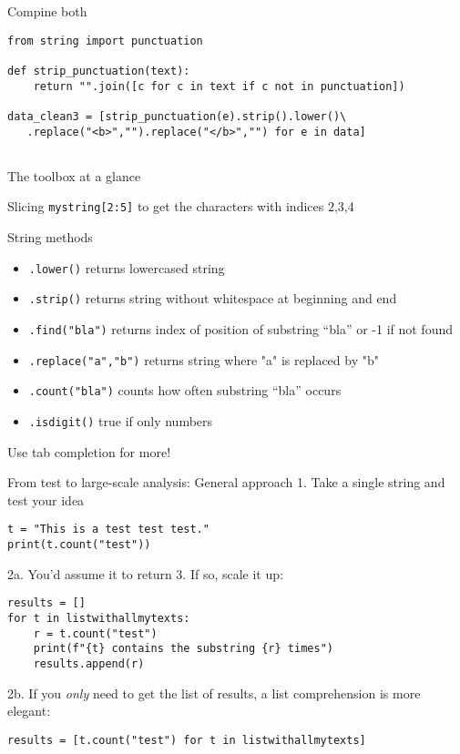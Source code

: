 \begin{frame}[fragile]{Compine both}
\begin{verbatim}
from string import punctuation

def strip_punctuation(text):
    return "".join([c for c in text if c not in punctuation])

data_clean3 = [strip_punctuation(e).strip().lower()\
   .replace("<b>","").replace("</b>","") for e in data]
    
\end{verbatim}
\end{frame}




\begin{frame}{The toolbox at a glance}
\begin{block}{Slicing}
\texttt{mystring[2:5]} to get the characters with indices 2,3,4
\end{block}

\begin{block}{String methods}
\begin{itemize}
	\item \texttt{.lower()} returns lowercased string
	\item \texttt{.strip()} returns string without whitespace at beginning and end
	\item \texttt{.find("bla")} returns index of position of substring ``bla'' or -1 if not found
	\item \texttt{.replace("a","b")} returns string where "a" is replaced by "b"
	\item \texttt{.count("bla")} counts how often substring ``bla'' occurs
        \item \texttt{.isdigit()} true if only numbers
          
\end{itemize}
Use tab completion for more!
\end{block}
\end{frame}




\begin{frame}[fragile]{From test to large-scale analysis: General approach}
1. Take a single string and test your idea
\begin{lstlisting}
t = "This is a test test test."
print(t.count("test"))
\end{lstlisting}
2a. You'd assume it to return 3. If so, scale it up:
\begin{lstlisting}
results = []
for t in listwithallmytexts:
    r = t.count("test")
    print(f"{t} contains the substring {r} times")
    results.append(r)
\end{lstlisting}

2b. If you \emph{only} need to get the list of results, a list comprehension is more elegant:
\begin{lstlisting}
results = [t.count("test") for t in listwithallmytexts]
\end{lstlisting}


\end{frame}


